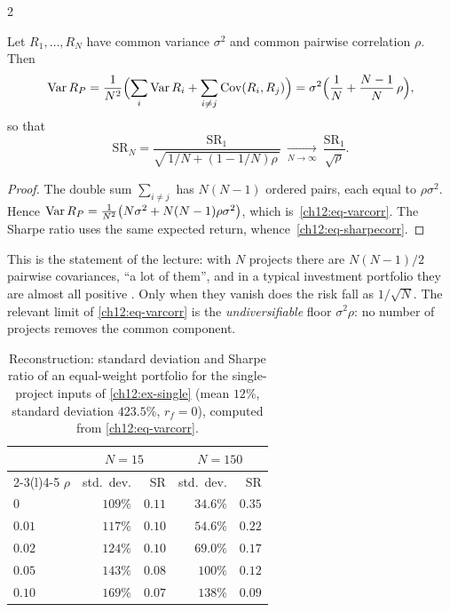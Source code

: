 \begin{paracol}{2}
\begin{proposition}\label{ch12:prop-corr}
Let $R_1,\dots,R_N$ have common variance $\sigma^2$ and common pairwise correlation $\rho$. Then
\begin{equation}\label{ch12:eq-varcorr}
  \operatorname{Var} R_P=\frac{1}{N^2}\Bigl(\sum_i\operatorname{Var} R_i+\sum_{i\neq j}\operatorname{Cov}(R_i,R_j)\Bigr)
  =\sigma^2\Bigl(\frac1N+\frac{N-1}{N}\,\rho\Bigr),
\end{equation}
so that
\begin{equation}\label{ch12:eq-sharpecorr}
  \mathrm{SR}_N=\frac{\mathrm{SR}_1}{\sqrt{\,1/N+(1-1/N)\rho\,}}\ \xrightarrow[N\to\infty]{}\ \frac{\mathrm{SR}_1}{\sqrt\rho}.
\end{equation}
\end{proposition}
\begin{proof}
The double sum $\sum_{i\neq j}$ has $N(N-1)$ ordered pairs, each equal to $\rho\sigma^2$. Hence
$\operatorname{Var} R_P=\frac{1}{N^2}\bigl(N\sigma^2+N(N-1)\rho\sigma^2\bigr)$, which is~\eqref{ch12:eq-varcorr}.
The Sharpe ratio uses the same expected return, whence~\eqref{ch12:eq-sharpecorr}.
\end{proof}
This is the statement of the lecture: with $N$ projects there are $N(N-1)/2$ pairwise covariances, ``a lot of them'',
and in a typical investment portfolio they are almost all positive . Only when they vanish
does the risk fall as $1/\sqrt N$. The relevant limit of \eqref{ch12:eq-varcorr} is the
\emph{undiversifiable} floor $\sigma^2\rho$: no number of projects removes the common component.

\begin{table}[ht]
\centering\small
\caption{Reconstruction: standard deviation and Sharpe ratio of an equal-weight portfolio for the single-project
inputs of \cref{ch12:ex-single} (mean $12\%$, standard deviation $423.5\%$, $r_f=0$), computed from
\eqref{ch12:eq-varcorr}.}\label{ch12:tab-corr}
\begin{tabular}{@{}lrrrr@{}}
\toprule
& \multicolumn{2}{c}{$N=15$} & \multicolumn{2}{c}{$N=150$}\\
\cmidrule(lr){2-3}\cmidrule(l){4-5}
$\rho$ & std.\ dev. & SR & std.\ dev. & SR\\
\midrule
$0$    & $109\%$ & $0.11$ & $34.6\%$ & $0.35$\\
$0.01$ & $117\%$ & $0.10$ & $54.6\%$ & $0.22$\\
$0.02$ & $124\%$ & $0.10$ & $69.0\%$ & $0.17$\\
$0.05$ & $143\%$ & $0.08$ & $100\%$ & $0.12$\\
$0.10$ & $169\%$ & $0.07$ & $138\%$ & $0.09$\\
\bottomrule
\end{tabular}
\end{table}


\end{paracol}
